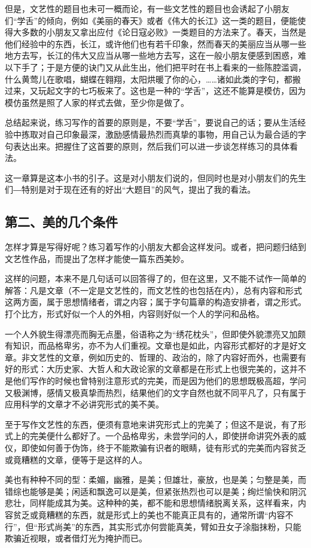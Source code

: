\documentclass[fontset=fandol,12pt,a5paper]{ctexbook}
\begin{document}
但是，文艺性的题目也未可一概而论，有一些文艺性的题目也会诱起了小朋友们“学舌”的倾向，例如《美丽的春天》或者《伟大的长江》这一类的题目，便能使得大多数的小朋友又拿出应付《论日寇必败》一类题目的方法来了。春天，当然是他们经验中的东西，长江，或许他们也有若千印象，然而春天的美丽应当从哪一些地方去写，长江的伟大又应当从哪一些地方去写，这在一般小朋友便感到困惑，难以下手了；于是方便的诀门又从此生出，他们把平时在书上看来的一些陈腔滥调，什么黄莺儿在歌唱，蝴蝶在翱翔，太阳烘暖了你的心，……诸如此类的字句，都搬过来，又玩起文字的七巧板来了。这也是一种的“学舌”，这还不能算是模仿，因为模仿虽然是照了人家的样式去做，至少你是做了。

总结起来说，练习写作的首要的原则是，不要“学舌”，要说自己的话；要从生活经验中拣取对自己印象最深，激励感情最热烈而真挚的事物，用自己认为最合适的字句表达出来。把握住了这首要的原则，然后我们可以进一步谈怎样练习的具体看法。

这一章算是这本小书的引子。这是对小朋友们说的，但同时也是对小朋友们的先生们―特别是对于现在还有的好出“大题目”的风气，提出了我的看法。

\subsection{第二、美的几个条件}
怎样才算是写得好呢？练习着写作的小朋友大都会这样发问。或者，把问题归结到文艺性作品，而提出了怎样才能使一篇东西美妙。

这样的问题，本来不是几句话可以回答得了的，但在这里，又不能不试作一简单的解答：凡是文章（不一定是文艺性的，而文艺性的也包括在内），总有内容和形式这两方面，属于思想情绪者，谓之内容；属于字句篇章的构造安排者，谓之形式。打个比方，形式好似一个人的外相，内容则好似一个人的学问和品格。

一个人外貌生得漂亮而胸无点墨，俗语称之为“绣花枕头”，但即使外貌漂亮又加颇有知识，而品格卑劣，亦不为人们重视。文章也是如此，内容形式都好的才是好文章。非文艺性的文章，例如历史的、哲理的、政治的，除了内容好而外，也需要有好的形式：大历史家、大哲人和大政论家的文章都是在形式上也很完美的，这并不是他们写作的时候也曾特别注意形式的完美，而是因为他们的思想既极高超，学问又极渊博，感情又极真挚而热烈，结果他们的文字自然也就不同平凡了，只有属于应用科学的文章才不必讲究形式的美不美。

至于写作文艺性的东西，便须有意地来讲究形式上的完美了；但这不是说，有了形式上的完美便什么都好了。一个品格卑劣，未尝学问的人，即使拼命讲究外表的威仪，即使如何善于伪饰，终于不能欺骗有识者的眼睛，徒有形式的完美而内容贫乏或竟糟糕的文章，便等于是这样的人。

美也有种种不同的型：柔媚，幽雅，是美；但雄壮，豪放，也是美；匀整是美，而错综也能够是美；闲适和飘逸可以是美，但紧张热烈也可以是美；绚烂愉快和阴沉悲壮，同样能成其为美。这种种的美，都不能和思想情绪脱离关系，这样看来，内容贫乏或竟糟糕的东西，就是形式上的美也不能真正具有的，通常所谓“内容不行”，但“形式尚美”的东西，其实形式亦何尝能真美，臂如丑女子涂脂抹粉，只能欺骗近视眼，或者借灯光为掩护而已。
\end{document}
